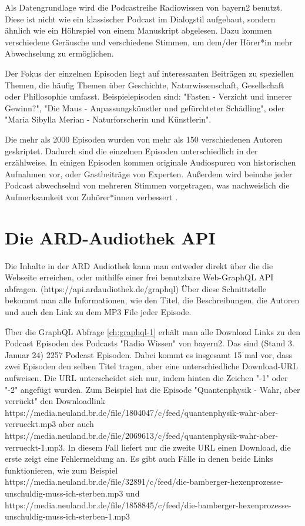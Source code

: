 Als Datengrundlage wird die Podcastreihe Radiowissen von bayern2 benutzt. 
Diese ist nicht wie ein klassischer Podcast im Dialogstil aufgebaut, sondern ähnlich wie ein Höhrspiel von einem Manuskript abgelesen.
Dazu kommen verschiedene Geräusche und verschiedene Stimmen, um dem/der Hörer*in mehr Abwechselung zu ermöglichen.

Der Fokus der einzelnen Episoden liegt auf interessanten Beiträgen zu speziellen Themen, die häufig  Themen über Geschichte, Naturwissenschaft, Gesellschaft oder Phillosophie umfasst.
Beispielepisoden sind: "Fasten - Verzicht und innerer Gewinn?", "Die Maus - Anpassungskünstler und gefürchteter Schädling", oder "Maria Sibylla Merian - Naturforscherin und Künstlerin".

Die mehr als 2000 Episoden wurden von mehr als 150 verschiedenen Autoren geskriptet.
Dadurch sind die einzelnen Episoden unterschiedlich in der erzählweise.
In einigen Episoden kommen originale Audiospuren von historischen Aufnahmen vor, oder Gastbeiträge von Experten.
Außerdem wird beinahe jeder Podcast abwechselnd von mehreren Stimmen vorgetragen, was nachweislich die Aufmerksamkeit von Zuhörer*innen verbessert \cite{kang2012}.




\section{Die ARD-Audiothek API}

Die Inhalte in der ARD Audiothek kann man entweder direkt über die die Webseite erreichen, oder mithilfe einer frei benutzbare Web-GraphQL API abfragen.
(https://api.ardaudiothek.de/graphql) 
Über diese Schnittstelle bekommt man alle Informationen, wie den Titel, die Beschreibungen, die Autoren und auch den Link zu dem MP3 File jeder Episode.

Über die GraphQL Abfrage \autoref{ch:graphql-1} erhält man alle Download Links zu den Podcast Episoden des Podcasts "Radio Wissen" von bayern2.
Das sind (Stand 3. Januar 24) 2257 Podcast Episoden.
Dabei kommt es insgesamt 15 mal vor, dass zwei Episoden den selben Titel tragen, aber eine unterschiedliche Download-URL aufweisen.
Die URL unterscheidet sich nur, indem hinten die Zeichen "-1" oder "-2" angefügt wurden.
Zum Beispiel hat die Episode "Quantenphysik - Wahr, aber verrückt" den Downloadlink https://media.neuland.br.de/file/1804047/c/feed/quantenphysik-wahr-aber-verrueckt.mp3 aber auch https://media.neuland.br.de/file/2069613/c/feed/quantenphysik-wahr-aber-verrueckt-1.mp3.
In diesem Fall liefert nur die zweite URL einen Download, die erste zeigt eine Fehlermeldung an.
Es gibt auch Fälle in denen beide Links funktionieren, wie zum Beispiel 
https://media.neuland.br.de/file/32891/c/feed/die-bamberger-hexenprozesse-unschuldig-muss-ich-sterben.mp3 und
https://media.neuland.br.de/file/1858845/c/feed/die-bamberger-hexenprozesse-unschuldig-muss-ich-sterben-1.mp3   

